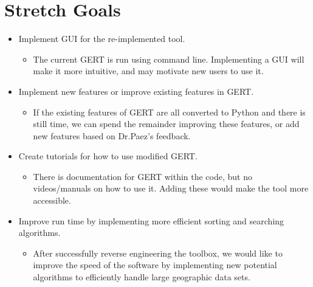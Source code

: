\documentclass{article}
\begin{document}
\section{Stretch Goals}
\begin{itemize}
    \item Implement GUI for the re-implemented tool.
    \begin{itemize}
        \item The current GERT is run using command line. Implementing a GUI will make it more intuitive, and may motivate new users to use it.
    \end{itemize}
    \item Implement new features or improve existing features in GERT.
    \begin{itemize}
        \item If the existing features of GERT are all converted to Python and there is still time, we can spend the remainder improving these features, or add new features based on Dr.Paez's feedback.
    \end{itemize}
    \item Create tutorials for how to use modified GERT.
    \begin{itemize}
        \item There is documentation for GERT within the code, but no videos/manuals on how to use it. Adding these would make the tool more accessible.
    \end{itemize}
    \item Improve run time by implementing more efficient sorting and searching algorithms.
    \begin{itemize}
        \item After successfully reverse engineering the toolbox, we would like to improve the speed of the software by implementing new potential algorithms to efficiently handle large geographic data sets.
    \end{itemize}
\end{itemize}
\end{document}
